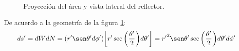 \begin{figure} [H]
\centering 
{}
\caption{Proyección del área y vista lateral del reflector.}
\label{grup_fig_principios:1}
\end{figure}
De acuerdo a la geometría de la figura \ref{grup_fig_principios:1}:
\begin{align}
ds' = dWdN = \left(r'\sen\theta 'd\phi '\right)\!\left[r'\sec\left(\frac{\theta '}{2}\right)\!d\theta '\right] = {r'}^2\sen\theta '\sec\left(\frac{\theta '}{2}\right)\!d\theta 'd\phi '
\label{ec_principios:48}
\end{align}
